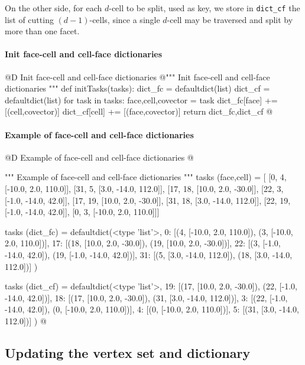 \documentclass[11pt,oneside]{article}	%
\begin{document}
On the other side, for each $d$-cell to be split, used as key, we store in \texttt{dict\_cf} the list of cutting $(d-1)$-cells, since a single $d$-cell may be traversed and split by more than one facet. 


\paragraph{Init face-cell and cell-face dictionaries}

@D Init face-cell and cell-face dictionaries
@{""" Init face-cell and cell-face dictionaries """
def initTasks(tasks):
	dict_fc = defaultdict(list)
	dict_cf = defaultdict(list)
	for task in tasks:
		face,cell,covector = task
		dict_fc[face] += [(cell,covector)] 
		dict_cf[cell] += [(face,covector)] 
	return dict_fc,dict_cf
@}

\paragraph{Example of face-cell and cell-face dictionaries}

@D Example of face-cell and cell-face dictionaries
@{""" Example of face-cell and cell-face dictionaries """
tasks (face,cell) = [
 [0, 4, [-10.0, 2.0, 110.0]],
 [31, 5, [3.0, -14.0, 112.0]],
 [17, 18, [10.0, 2.0, -30.0]],
 [22, 3, [-1.0, -14.0, 42.0]],
 [17, 19, [10.0, 2.0, -30.0]],
 [31, 18, [3.0, -14.0, 112.0]],
 [22, 19, [-1.0, -14.0, 42.0]],
 [0, 3, [-10.0, 2.0, 110.0]]]

tasks (dict_fc) = defaultdict(<type 'list'>, {
  0: [(4, [-10.0, 2.0, 110.0]), (3, [-10.0, 2.0, 110.0])],
 17: [(18, [10.0, 2.0, -30.0]), (19, [10.0, 2.0, -30.0])],
 22: [(3, [-1.0, -14.0, 42.0]), (19, [-1.0, -14.0, 42.0])],
 31: [(5, [3.0, -14.0, 112.0]), (18, [3.0, -14.0, 112.0])]  })

tasks (dict_cf) = defaultdict(<type 'list'>, {
 19: [(17, [10.0, 2.0, -30.0]), (22, [-1.0, -14.0, 42.0])],
 18: [(17, [10.0, 2.0, -30.0]), (31, [3.0, -14.0, 112.0])],
  3: [(22, [-1.0, -14.0, 42.0]), (0, [-10.0, 2.0, 110.0])],
  4: [(0, [-10.0, 2.0, 110.0])],
  5: [(31, [3.0, -14.0, 112.0])]  })
@}


\subsection{Updating the vertex set and dictionary}
\label{sec:updating}
\end{document}
